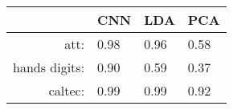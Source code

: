 \begin{tabular}{|r|l|l|l|}
  \hline
    & CNN & LDA & PCA \\
  \hline
  att: & 0.98 & 0.96 & 0.58 \\
  \hline
  hands digits: & 0.90 & 0.59 & 0.37 \\
  \hline
  caltec: & 0.99 & 0.99 & 0.92 \\
  \hline
\end{tabular}
